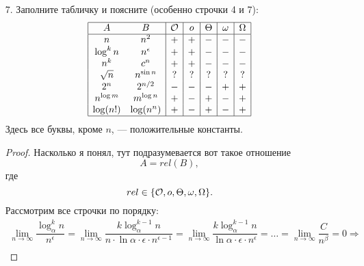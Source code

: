 \begin{enumerate}
\begin{enumerate}
\begin{proof}
        \textit{В обратную сторону}: если известно, что функция $f$ или строго меньше функции $g$, или равна $g$, то это означает, что не превосходит (меньше либо равна) $g$:
        \begin{equation}
          (f \prec g) \lor (f \sim g) \Rightarrow f \preceq g.
        \end{equation}
        Так как было проведено доказательство в обе стороны, то можно ввести эквивалентность устверждений:
        \begin{equation}
          f \preceq g \Leftrightarrow (f \prec g) \lor (f \sim g).
        \end{equation}
      \end{proof}
    \end{enumerate}

  \item[7.] Заполните табличку и поясните (особенно строчки 4 и 7):
    $$
    \begin{array}{|cc|c|c|c|c|c|}
      \hline
      A & B & \mathcal{O} & o & \Theta & \omega & \Omega \\
      \hline
      n & n^2 & + & + & - & - & - \\
      \log^k n & n^{\epsilon} & + & + & - & - & - \\
      n^k & c^n & + & + & - & - & - \\
      \sqrt{n} & n^{\sin n} & ? & ? & ? & ? & ? \\
      2^n & 2^{n \slash 2} & - & - & - & + & + \\
      n^{\log m} & m^{\log n} & + & - & + & - & + \\
      \log (n!) & \log(n^n) & + & - & + & - & + \\
      \hline
    \end{array}
    $$
    Здесь все буквы, кроме $n$, --- положительные константы.
    \begin{proof}
      Насколько я понял, тут подразумевается вот такое отношение $$A = rel(B),$$
      где
      $$rel \in \{\mathcal{O}, o, \Theta, \omega, \Omega\}.$$
      Рассмотрим все строчки по порядку:
      \begin{eqnarray}
        \lim\limits_{n \to \infty}{\dfrac{\log_{\alpha}^k n}{n^{\epsilon}}} = \lim\limits_{n \to \infty}{\dfrac{k\log_{\alpha}^{k-1} n}{n \cdot \ln \alpha \cdot \epsilon \cdot n^{\epsilon - 1}}} = \lim\limits_{n \to \infty}{\dfrac{k\log_{\alpha}^{k-1} n}{\ln \alpha \cdot \epsilon \cdot n^{\epsilon}}} = \ldots = \lim\limits_{n \to \infty}{\dfrac{C}{n^{\beta}}} = 0 \Rightarrow \\

\end{eqnarray}
\end{proof}
\end{enumerate}
